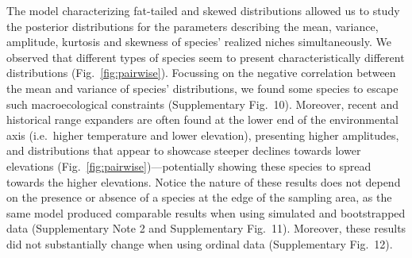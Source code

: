 \documentclass[11pt, a4paper]{article}
\begin{document}
The model characterizing fat-tailed and skewed distributions allowed us to study the posterior distributions for the parameters describing the mean, variance, amplitude, kurtosis and skewness of species' realized niches simultaneously. We observed that different types of species seem to present characteristically different distributions (Fig.~\ref{fig:pairwise}). Focussing on the negative correlation between the mean and variance of species' distributions, we found some species to escape such macroecological constraints (Supplementary Fig.~10).  Moreover, recent and historical range expanders are often found at the lower end of the environmental axis (i.e.~higher temperature and lower elevation), presenting higher amplitudes, and distributions that appear to showcase steeper declines towards lower elevations (Fig.~\ref{fig:pairwise})---potentially showing these species to spread towards the higher elevations. Notice the nature of these results does not depend on the presence or absence of a species at the edge of the sampling area, as the same model produced comparable results when using simulated and bootstrapped data (Supplementary Note 2 and Supplementary Fig.~11). Moreover, these results did not substantially change when using ordinal data (Supplementary Fig.~12).


\end{document}
